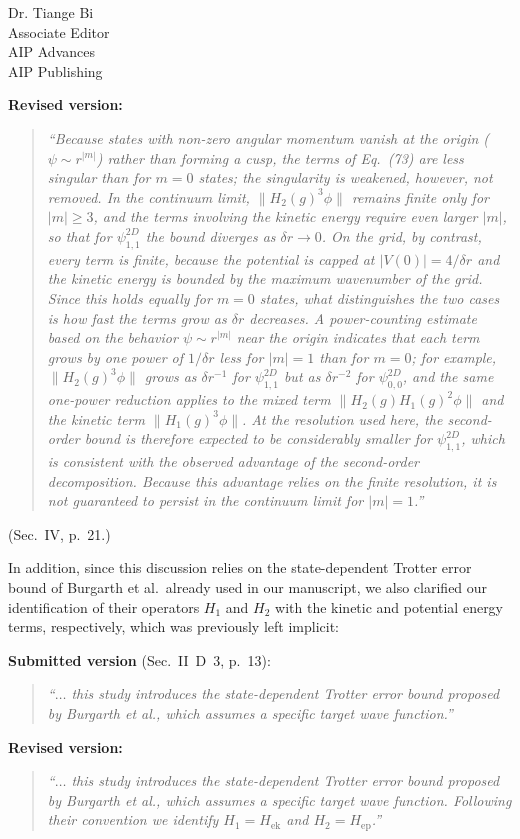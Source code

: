 \documentclass[11pt]{letter}
\begin{document}
\begin{letter}{Dr. Tiange Bi \\ Associate Editor \\ AIP Advances \\ AIP Publishing}
\begin{enumerate}
\noindent\textbf{Revised version:}
\begin{quote}
\itshape
``Because states with non-zero angular momentum vanish at the origin
($\psi\sim r^{|m|}$) rather than forming a cusp, the terms of Eq.~(73) are
less singular than for $m=0$ states; the singularity is weakened, however,
not removed. In the continuum limit, $\|H_2(g)^3\phi\|$ remains finite only
for $|m|\ge3$, and the terms involving the kinetic energy require even larger
$|m|$, so that for $\psi^{2D}_{1,1}$ the bound diverges as $\delta r\to0$. On
the grid, by contrast, every term is finite, because the potential is capped
at $|V(0)|=4/\delta r$ and the kinetic energy is bounded by the maximum
wavenumber of the grid. Since this holds equally for $m=0$ states, what
distinguishes the two cases is how fast the terms grow as $\delta r$
decreases. A power-counting estimate based on the behavior $\psi\sim r^{|m|}$
near the origin indicates that each term grows by one power of $1/\delta r$
less for $|m|=1$ than for $m=0$; for example, $\|H_2(g)^3\phi\|$ grows as
$\delta r^{-1}$ for $\psi^{2D}_{1,1}$ but as $\delta r^{-2}$ for
$\psi^{2D}_{0,0}$, and the same one-power reduction applies to the mixed term
$\|H_2(g)H_1(g)^2\phi\|$ and the kinetic term $\|H_1(g)^3\phi\|$. At the
resolution used here, the second-order bound is therefore expected to be
considerably smaller for $\psi^{2D}_{1,1}$, which is consistent with the
observed advantage of the second-order decomposition. Because this advantage
relies on the finite resolution, it is not guaranteed to persist in the
continuum limit for $|m|=1$.''
\end{quote}
(Sec.~IV, p.~21.)

In addition, since this discussion relies on the state-dependent Trotter error
bound of Burgarth et al.\ already used in our manuscript, we also clarified
our identification of their operators $H_1$ and $H_2$ with the kinetic and
potential energy terms, respectively, which was previously left implicit:

\smallskip
\noindent\textbf{Submitted version} (Sec.~II~D~3, p.~13):
\begin{quote}
\itshape
``$\dots$ this study introduces the state-dependent Trotter error bound
proposed by Burgarth et al., which assumes a specific target wave function.''
\end{quote}

\noindent\textbf{Revised version:}
\begin{quote}
\itshape
``$\dots$ this study introduces the state-dependent Trotter error bound
proposed by Burgarth et al., which assumes a specific target wave function.
Following their convention we identify $H_1=H_{\mathrm{ek}}$ and
$H_2=H_{\mathrm{ep}}$.''
\end{quote}


\end{enumerate}
\end{letter}
\end{document}
